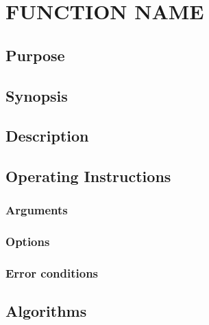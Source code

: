 \documentclass{article}
\begin{document}
\section{FUNCTION NAME}

\subsection{Purpose}


\subsection{Synopsis}



\subsection{Description}


\subsection{Operating Instructions}


\subsubsection{Arguments}


\subsubsection{Options}

\subsubsection{Error conditions}


\subsection{Algorithms}
\end{document}

